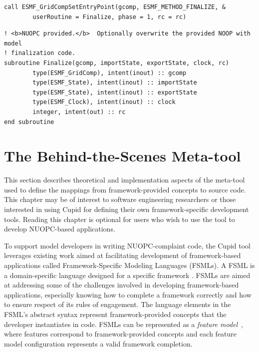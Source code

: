 \documentclass[oneside,11pt]{memoir}
\begin{document}
\begin{enumerate}
\begin{lstlisting}[label={lst:simple1}, caption=A call to register the generated subroutine as an ESMF Finalize method. This call is inserted at the end of the Model's \texttt{SetServices} method.]
call ESMF_GridCompSetEntryPoint(gcomp, ESMF_METHOD_FINALIZE, & 
		userRoutine = Finalize, phase = 1, rc = rc)
\end{lstlisting}

\begin{lstlisting}[label={lst:simple2}, caption=A Finalize subroutine stub to be customized. The subroutine is inserted at the end of the module.]
! <b>NUOPC provided.</b>  Optionally overwrite the provided NOOP with model 
! finalization code.
subroutine Finalize(gcomp, importState, exportState, clock, rc)
		type(ESMF_GridComp), intent(inout) :: gcomp
		type(ESMF_State), intent(inout) :: importState
		type(ESMF_State), intent(inout) :: exportState
		type(ESMF_Clock), intent(inout) :: clock
		integer, intent(out) :: rc
end subroutine
\end{lstlisting}


\end{enumerate}


\chapter{The Behind-the-Scenes Meta-tool}

This section describes theoretical and implementation aspects of the meta-tool used to define the mappings from framework-provided concepts to source code. This chapter may be of interest to software engineering researchers or those interested in using Cupid for defining their own framework-specific development tools. Reading this chapter is optional for users who wish to use the tool to develop NUOPC-based applications.

To support model developers in writing NUOPC-complaint code, the Cupid tool leverages existing work aimed at facilitating development of framework-based applications called Framework-Specific Modeling Languages (FSMLs). A FSML is a domain-specific language designed for a specific framework \cite{antkiewicz06}. FSMLs are aimed at addressing some of the challenges involved in developing framework-based applications, especially knowing how to complete a framework correctly and how to ensure respect of its rules of engagement\cite{antkiewicz06}. The language elements in the FSML's abstract syntax represent framework-provided concepts that the developer instantiates in code. FSMLs can be represented as a \emph{feature model}~\cite{czarnecki}, where features correspond to framework-provided concepts and each feature model configuration represents a valid framework completion.
\end{document}

